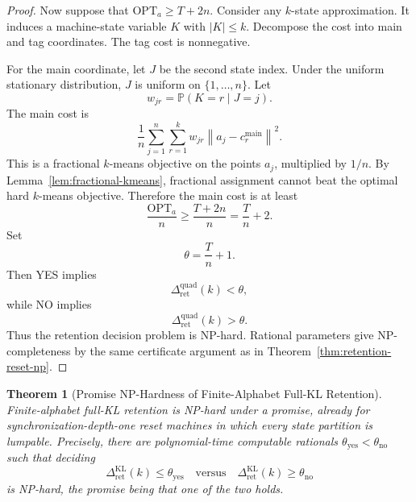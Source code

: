 \documentclass[12pt]{article}
\newtheorem{theorem}{Theorem}[section]
\theoremstyle{definition}
\newcommand{\norm}[1]{\left\lVert#1\right\rVert}
\newcommand{\RetKL}{\Delta_{\mathrm{ret}}^{\mathrm{KL}}}
\newcommand{\RetQuad}{\Delta_{\mathrm{ret}}^{\mathrm{quad}}}
\begin{document}
\begin{proof}
Now suppose that $\mathrm{OPT}_a\ge T+2n$.  Consider any $k$-state
approximation.  It induces a machine-state variable $K$ with $|K|\le k$.
Decompose the cost into main and tag coordinates.  The tag cost is
nonnegative.

For the main coordinate, let $J$ be the second state index.  Under the uniform
stationary distribution, $J$ is uniform on $\{1,\dots,n\}$.  Let
\[
w_{jr}=\mathbb P(K=r\mid J=j).
\]
The main cost is
\[
\frac1n
\sum_{j=1}^n
\sum_{r=1}^k
w_{jr}
\norm{a_j-c_r^{\mathrm{main}}}^2.
\]
This is a fractional $k$-means objective on the points $a_j$, multiplied by
$1/n$.  By Lemma~\ref{lem:fractional-kmeans}, fractional assignment cannot
beat the optimal hard $k$-means objective.  Therefore the main cost is at least
\[
\frac{\mathrm{OPT}_a}{n}
\ge
\frac{T+2n}{n}
=
\frac{T}{n}+2.
\]
Set
\[
\theta=\frac{T}{n}+1.
\]
Then YES implies
\[
\RetQuad(k)<\theta,
\]
while NO implies
\[
\RetQuad(k)>\theta.
\]
Thus the retention decision problem is NP-hard.  Rational parameters give
NP-completeness by the same certificate argument as in
Theorem~\ref{thm:retention-reset-np}.
\end{proof}

\begin{theorem}[Promise NP-Hardness of Finite-Alphabet Full-KL Retention]
\label{thm:full-kl-promise-np}
Finite-alphabet full-KL retention is NP-hard under a promise, already for
synchronization-depth-one reset machines in which every state partition is
lumpable.  Precisely, there are polynomial-time computable rationals
$\theta_{\mathrm{yes}}<\theta_{\mathrm{no}}$ such that deciding
\[
\RetKL(k)\le\theta_{\mathrm{yes}}
\quad\text{versus}\quad
\RetKL(k)\ge\theta_{\mathrm{no}}
\]
is NP-hard, the promise being that one of the two holds.
\end{theorem}
\end{document}
